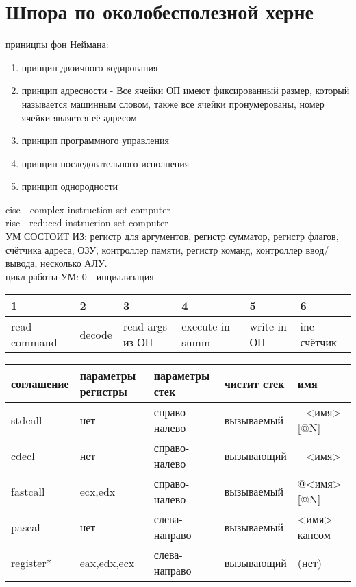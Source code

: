 \documentclass[a4paper,10pt]{article}
\begin{document}
\section*{Шпора по околобесполезной херне}
приницпы фон Неймана: \\
\begin{enumerate}
    \item принцип двоичного кодирования
    \item принцип адресности - Все ячейки ОП имеют фиксированный размер, который называется машинным словом, также все ячейки пронумерованы, номер ячейки является её адресом
    \item принцип программного управления
    \item принцип последовательного исполнения
    \item принцип однородности
\end{enumerate}
cisc - complex instruction set computer \\
risc - reduced instrucrion set computer \\
УМ СОСТОИТ ИЗ: регистр для аргументов, регистр сумматор, регистр флагов, счётчика адреса, ОЗУ, контроллер памяти, регистр команд, контроллер ввод/вывода, несколько АЛУ. \\ 
цикл работы УМ: 0 - инциализация \\
\begin{tabularx}{\textwidth}{|X|X|X|X|X|X|}
    \hline
    1&2&3&4&5&6 \\
    \hline
    read command&decode&read args из ОП&execute in summ&write in ОП&inc счётчик\\    
    \hline
\end{tabularx}
\begin{tabularx}{\textwidth}{|X|X|X|X|X|}
    \hline
    соглашение & параметры регистры & параметры стек & чистит стек & имя \\
    \hline
    stdcall & нет & справо-налево & вызываемый & \_<имя>[@N] \\
    \hline
    cdecl & нет & справо-налево & вызывающий & \_<имя> \\
    \hline
    fastcall & ecx,edx & справо-налево & вызываемый & @<имя>[@N] \\
    \hline
    pascal & нет & слева-направо & вызываемый & <имя> капсом \\
    \hline
    register* & eax,edx,ecx  & слева-направо & вызывающий & (нет) \\
    \hline
\end{tabularx} \\
\end{document}
